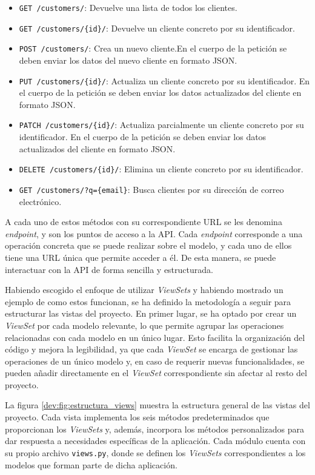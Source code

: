 \begin{itemize}
    \item \texttt{GET /customers/}: Devuelve una lista de todos los clientes.
    \item \texttt{GET /customers/\{id\}/}: Devuelve un cliente concreto por su identificador.
    \item \texttt{POST /customers/}: Crea un nuevo cliente.En el cuerpo de la petición se deben enviar los datos del nuevo cliente en formato JSON.
    \item \texttt{PUT /customers/\{id\}/}: Actualiza un cliente concreto por su identificador. En el cuerpo de la petición se deben enviar los datos actualizados del cliente en formato JSON.
    \item \texttt{PATCH /customers/\{id\}/}: Actualiza parcialmente un cliente concreto por su identificador. En el cuerpo de la petición se deben enviar los datos actualizados del cliente en formato JSON.
    \item \texttt{DELETE /customers/\{id\}/}: Elimina un cliente concreto por su identificador.
    \item \texttt{GET /customers/?q=\{email\}}: Busca clientes por su dirección de correo electrónico.
\end{itemize}

A cada uno de estos métodos con su correspondiente URL se les denomina \textit{endpoint}, y son los puntos de acceso a la API. Cada \textit{endpoint} corresponde a una operación concreta que se puede realizar sobre el modelo, y cada uno de ellos tiene una URL única que permite acceder a él. De esta manera, se puede interactuar con la API de forma sencilla y estructurada.

Habiendo escogido el enfoque de utilizar \textit{ViewSets} y habiendo mostrado un ejemplo de como estos funcionan, se ha definido la metodología a seguir para estructurar las vistas del proyecto. En primer lugar, se ha optado por crear un \textit{ViewSet} por cada modelo relevante, lo que permite agrupar las operaciones relacionadas con cada modelo en un único lugar. Esto facilita la organización del código y mejora la legibilidad, ya que cada \textit{ViewSet} se encarga de gestionar las operaciones de un único modelo y, en caso de requerir nuevas funcionalidades, se pueden añadir directamente en el \textit{ViewSet} correspondiente sin afectar al resto del proyecto.

La figura \ref{dev:fig:estructura_views} muestra la estructura general de las vistas del proyecto. Cada vista implementa los seis métodos predeterminados que proporcionan los \textit{ViewSets} y, además, incorpora los métodos personalizados para dar respuesta a necesidades específicas de la aplicación. Cada módulo cuenta con su propio archivo \texttt{views.py}, donde se definen los \textit{ViewSets} correspondientes a los modelos que forman parte de dicha aplicación.


